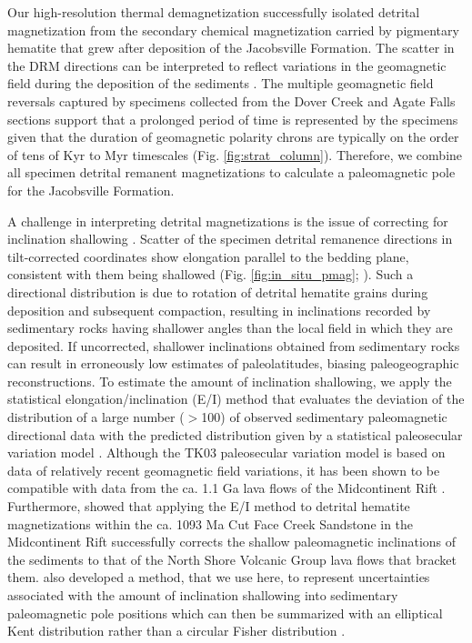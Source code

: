 Our high-resolution thermal demagnetization successfully isolated detrital magnetization from the secondary chemical magnetization carried by pigmentary hematite that grew after deposition of the Jacobsville Formation. The scatter in the DRM directions can be interpreted to reflect variations in the geomagnetic field during the deposition of the sediments \citep{Steiner1983a, Tauxe1984a}. The multiple geomagnetic field reversals captured by specimens collected from the Dover Creek and Agate Falls sections support that a prolonged period of time is represented by the specimens given that the duration of geomagnetic polarity chrons are typically on the order of tens of Kyr to Myr timescales (Fig. \ref{fig:strat_column}). Therefore, we combine all specimen detrital remanent magnetizations to calculate a paleomagnetic pole for the Jacobsville Formation.

A challenge in interpreting detrital magnetizations is the issue of correcting for inclination shallowing \citep{King1955a, Tauxe2004b, Bilardello2016b}. Scatter of the specimen detrital remanence directions in tilt-corrected coordinates show elongation parallel to the bedding plane, consistent with them being shallowed (Fig. \ref{fig:in_situ_pmag}; \citealp{Tauxe2004b}). Such a directional distribution is due to rotation of detrital hematite grains during deposition and subsequent compaction, resulting in inclinations recorded by sedimentary rocks having shallower angles than the local field in which they are deposited. If uncorrected, shallower inclinations obtained from sedimentary rocks can result in erroneously low estimates of paleolatitudes, biasing paleogeographic reconstructions. To estimate the amount of inclination shallowing, we apply the statistical elongation/inclination (E/I) method that evaluates the deviation of the distribution of a large number ($>$100) of observed sedimentary paleomagnetic directional data with the predicted distribution given by a statistical paleosecular variation model \citep{Tauxe2004b}. Although the TK03 paleosecular variation model is based on data of relatively recent geomagnetic field variations, it has been shown to be compatible with data from the ca. 1.1 Ga lava flows of the Midcontinent Rift \citep{Tauxe2009a}. Furthermore, \cite{Pierce2022a} showed that applying the E/I method to detrital hematite magnetizations within the ca. 1093 Ma Cut Face Creek Sandstone in the Midcontinent Rift successfully corrects the shallow paleomagnetic inclinations of the sediments to that of the North Shore Volcanic Group lava flows that bracket them. \cite{Pierce2022a} also developed a method, that we use here, to represent uncertainties associated with the amount of inclination shallowing into sedimentary paleomagnetic pole positions which can then be summarized with an elliptical Kent distribution \citep{Kent1982a} rather than a circular Fisher distribution \citep{Fisher1953a}. 

